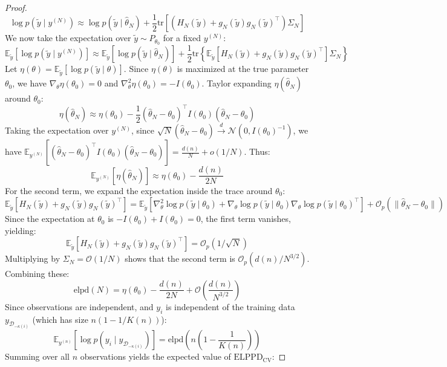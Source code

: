 \documentclass[12pt]{article}
\begin{document}
\begin{proof}
\[
\log p(\tilde{y} \mid y^{(N)}) \approx \log p(\tilde{y} \mid \hat{\theta}_N) + \frac{1}{2} \text{tr}\left[ \left( H_N(\tilde{y}) + g_N(\tilde{y}) g_N(\tilde{y})^\top \right) \Sigma_N \right]
\]
We now take the expectation over $\tilde{y} \sim P_{\theta_0}$ for a fixed $y^{(N)}$:
\[
\mathbb{E}_{\tilde{y}} \left[ \log p(\tilde{y} \mid y^{(N)}) \right] \approx \mathbb{E}_{\tilde{y}} \left[ \log p(\tilde{y} \mid \hat{\theta}_N) \right] + \frac{1}{2} \text{tr}\left\{ \mathbb{E}_{\tilde{y}} \left[ H_N(\tilde{y}) + g_N(\tilde{y}) g_N(\tilde{y})^\top \right] \Sigma_N \right\}
\]
Let $\eta(\theta) = \mathbb{E}_{\tilde{y}} [\log p(\tilde{y} \mid \theta)]$. Since $\eta(\theta)$ is maximized at the true parameter $\theta_0$, we have $\nabla_\theta \eta(\theta_0) = 0$ and $\nabla^2_\theta \eta(\theta_0) = -I(\theta_0)$. Taylor expanding $\eta(\hat{\theta}_N)$ around $\theta_0$:
\[
\eta(\hat{\theta}_N) \approx \eta(\theta_0) - \frac{1}{2} (\hat{\theta}_N - \theta_0)^\top I(\theta_0) (\hat{\theta}_N - \theta_0)
\]
Taking the expectation over $y^{(N)}$, since $\sqrt{N}(\hat{\theta}_N - \theta_0) \xrightarrow{d} \mathcal{N}(0, I(\theta_0)^{-1})$, we have $\mathbb{E}_{y^{(N)}} [(\hat{\theta}_N - \theta_0)^\top I(\theta_0) (\hat{\theta}_N - \theta_0)] = \frac{d(n)}{N} + o(1/N)$. Thus:
\[
\mathbb{E}_{y^{(N)}} [ \eta(\hat{\theta}_N) ] \approx \eta(\theta_0) - \frac{d(n)}{2N}
\]
For the second term, we expand the expectation inside the trace around $\theta_0$:
\[
\mathbb{E}_{\tilde{y}} \left[ H_N(\tilde{y}) + g_N(\tilde{y}) g_N(\tilde{y})^\top \right] = \mathbb{E}_{\tilde{y}} \left[ \nabla^2_\theta \log p(\tilde{y} \mid \theta_0) + \nabla_\theta \log p(\tilde{y} \mid \theta_0) \nabla_\theta \log p(\tilde{y} \mid \theta_0)^\top \right] + \mathcal{O}_p(\|\hat{\theta}_N - \theta_0\|)
\]
Since the expectation at $\theta_0$ is $-I(\theta_0) + I(\theta_0) = 0$, the first term vanishes, yielding:
\[
\mathbb{E}_{\tilde{y}} \left[ H_N(\tilde{y}) + g_N(\tilde{y}) g_N(\tilde{y})^\top \right] = \mathcal{O}_p(1/\sqrt{N})
\]
Multiplying by $\Sigma_N = \mathcal{O}(1/N)$ shows that the second term is $\mathcal{O}_p(d(n)/N^{3/2})$. Combining these:
\[
\text{elpd}(N) = \eta(\theta_0) - \frac{d(n)}{2N} + \mathcal{O}\left(\frac{d(n)}{N^{3/2}}\right)
\]
Since observations are independent, and $y_i$ is independent of the training data $y_{\mathcal{D}_{-\kappa(i)}}$ (which has size $n(1 - 1/K(n))$):
\[
\mathbb{E}_{y^{(n)}} \left[ \log p(y_i \mid y_{\mathcal{D}_{-\kappa(i)}}) \right] = \text{elpd}\left( n\left(1 - \frac{1}{K(n)}\right) \right)
\]
Summing over all $n$ observations yields the expected value of $\text{ELPPD}_{\text{CV}}$:

\end{proof}
\end{document}
